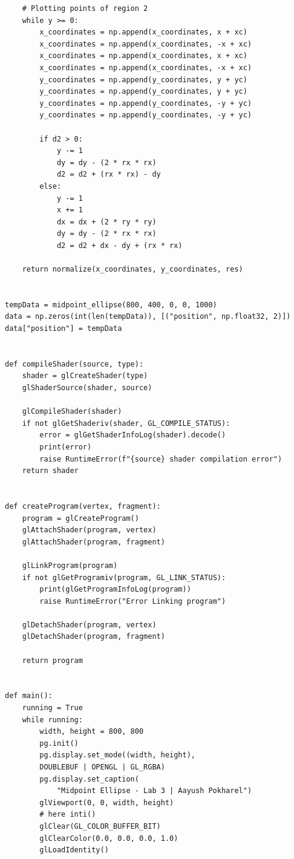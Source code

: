\documentclass[12pt]{article}
\begin{document}
\begin{verbatim}
    # Plotting points of region 2
    while y >= 0:
        x_coordinates = np.append(x_coordinates, x + xc)
        x_coordinates = np.append(x_coordinates, -x + xc)
        x_coordinates = np.append(x_coordinates, x + xc)
        x_coordinates = np.append(x_coordinates, -x + xc)
        y_coordinates = np.append(y_coordinates, y + yc)
        y_coordinates = np.append(y_coordinates, y + yc)
        y_coordinates = np.append(y_coordinates, -y + yc)
        y_coordinates = np.append(y_coordinates, -y + yc)

        if d2 > 0:
            y -= 1
            dy = dy - (2 * rx * rx)
            d2 = d2 + (rx * rx) - dy
        else:
            y -= 1
            x += 1
            dx = dx + (2 * ry * ry)
            dy = dy - (2 * rx * rx)
            d2 = d2 + dx - dy + (rx * rx)

    return normalize(x_coordinates, y_coordinates, res)


tempData = midpoint_ellipse(800, 400, 0, 0, 1000)
data = np.zeros(int(len(tempData)), [("position", np.float32, 2)])
data["position"] = tempData


def compileShader(source, type):
    shader = glCreateShader(type)
    glShaderSource(shader, source)

    glCompileShader(shader)
    if not glGetShaderiv(shader, GL_COMPILE_STATUS):
        error = glGetShaderInfoLog(shader).decode()
        print(error)
        raise RuntimeError(f"{source} shader compilation error")
    return shader


def createProgram(vertex, fragment):
    program = glCreateProgram()
    glAttachShader(program, vertex)
    glAttachShader(program, fragment)

    glLinkProgram(program)
    if not glGetProgramiv(program, GL_LINK_STATUS):
        print(glGetProgramInfoLog(program))
        raise RuntimeError("Error Linking program")

    glDetachShader(program, vertex)
    glDetachShader(program, fragment)

    return program


def main():
    running = True
    while running:
        width, height = 800, 800
        pg.init()
        pg.display.set_mode((width, height),
        DOUBLEBUF | OPENGL | GL_RGBA)
        pg.display.set_caption(
            "Midpoint Ellipse - Lab 3 | Aayush Pokharel")
        glViewport(0, 0, width, height)
        # here inti()
        glClear(GL_COLOR_BUFFER_BIT)
        glClearColor(0.0, 0.0, 0.0, 1.0)
        glLoadIdentity()


\end{verbatim}
\end{document}
